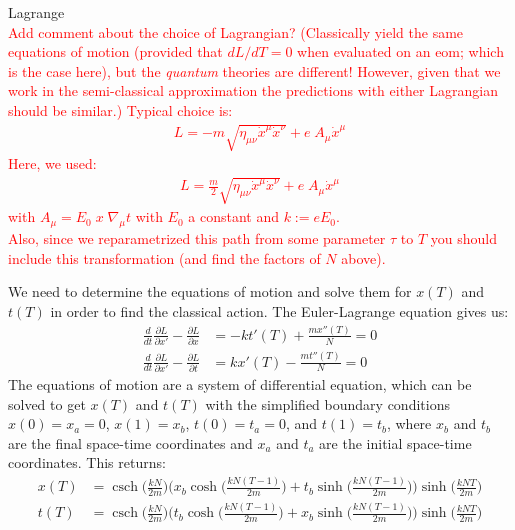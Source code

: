 \documentclass[12pt]{revtex4}
\DeclareMathOperator{\csch}{csch}
\newcommand{\red}{\textcolor{red}}
\begin{document}
Lagrange 
\red{\\
Add comment about the choice of Lagrangian? (Classically yield the same equations of motion (provided that $dL/dT =0$ when evaluated on an eom; which is the case here), but the \textit{quantum} theories are different! 
However, given that we work in the semi-classical approximation the predictions with either Lagrangian should be similar.)
Typical choice is:
\begin{align}
L = - m \sqrt{\eta_{\mu \nu} \dot{x}^{\mu} \dot{x}^{\nu} } + e \; A_\mu \dot{x}^{\mu} 
\end{align}
Here, we used:
\begin{align}
L = \frac{m}{2} \sqrt{\eta_{\mu \nu} \dot{x}^{\mu} \dot{x}^{\nu} } + e \; A_\mu \dot{x}^{\mu} 
\end{align}
with $A_\mu = E_0 \; x \; \nabla_\mu t$ with $E_0$ a constant and $k := e E_0$.
\\
Also, since we reparametrized this path from some parameter $\tau$ to $T$ you should include this transformation (and find the factors of $N$ above).
}

We need to determine the equations of motion and solve them for $x(T)$ and $t(T)$ in order to find the classical action. The Euler-Lagrange equation gives us:
\begin{align*}
\frac{d}{dt}\frac{\partial L}{\partial x'}-\frac{\partial L}{\partial x} &= -k t'(T) + \frac{m x''(T)}{N} =0\\
\frac{d}{dt}\frac{\partial L}{\partial x'}-\frac{\partial L}{\partial t} &= k x'(T) - \frac{m t''(T)}{N} =0
\end{align*}
The equations of motion are a system of differential equation, which can be solved to get $x(T)$ and $t(T)$ with the simplified boundary conditions $x(0) = x_a = 0$, $x(1)=x_b$, $t(0) = t_a = 0$, and $t(1)=t_b$, where $x_b$ and $t_b$ are the final space-time coordinates and $x_a$ and $t_a$ are the initial space-time coordinates. This returns:
\begin{align*}
x(T) &= \csch \bigg(\frac{k N}{2 m}\bigg) \Biggr(x_b \cosh\bigg(\frac{k N (T-1)}{2m}\bigg)+ 
t_b \sinh\bigg(\frac{k N (T-1)}{2m}\bigg)\Biggr) \sinh\bigg(\frac{k N T}{2m}\bigg)\\
t(T)&= \csch \bigg(\frac{k N}{2 m}\bigg) \Biggr(t_b \cosh\bigg(\frac{k N (T-1)}{2m}\bigg)+ 
x_b \sinh\bigg(\frac{k N (T-1)}{2m}\bigg)\Biggr) \sinh\bigg(\frac{k N T}{2m}\bigg)
\end{align*} 
\end{document}
